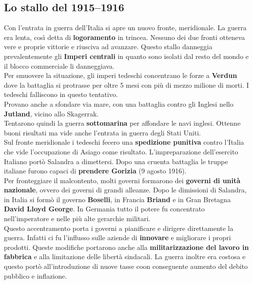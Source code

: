 \subsection{Lo stallo del 1915--1916}
Con l'entrata in guerra dell'Italia si apre un nuovo fronte, meridionale. La guerra era lenta, così
detta di \textbf{logoramento} in trincea. Nessuno dei due fronti otteneva vere e proprie vittorie
e riusciva ad avanzare. Questo stallo danneggia prevalentemente gli \textbf{Imperi centrali} in 
quanto sono isolati dal resto del mondo e il blocco commerciale li danneggiava.\\
Per smuovere la situazione, gli imperi tedeschi concentrano le forze a \textbf{Verdun} dove la
battaglia si protrasse per oltre 5 mesi con più di mezzo milione di morti. I tedeschi falliscono
in questo tentativo.\\
Provano anche a sfondare via mare, con una battaglia contro gli Inglesi nello \textbf{Jutland},
vicino allo Skagerrak.\\
Tentarono quindi la guerra \textbf{sottomarina} per affondare le navi inglesi. Ottenne buoni 
risultati ma vide anche l'entrata in guerra degli Stati Uniti.\\ [\baselineskip]
Sul fronte meridionale i tedeschi fecero una \textbf{spedizione punitiva} contro l'Italia che
vide l'occupazione di Asiago come risultato. L'impreparazione dell'esercito Italiano portò Salandra
a dimettersi. Dopo una cruenta battaglia le truppe italiane furono capaci di \textbf{prendere 
Gorizia} (9 agosto 1916).\\ [\baselineskip]
Per fronteggiare il malcontento, molti governi formarono dei \textbf{governi di unità nazionale}, 
ovvero dei governi di grandi alleanze. Dopo le dimissioni di Salandra, in Italia si formò il governo
\textbf{Boselli}, in Francia \textbf{Briand} e in Gran Bretagna \textbf{David Lloyd George}. In
Germania tutto il potere fu concentrato nell'imperatore e nelle più alte gerarchie militari.\\
Questo accentramento porta i governi a pianificare e dirigere direttamente la guerra. Infatti ci fu
l'influsso sulle aziende di \textbf{innovare} e migliorare i propri prodotti. Queste modifiche
portarono anche alla \textbf{militarizzazione del lavoro in fabbrica} e alla limitazione delle
libertà sindacali. La guerra inoltre era costosa e questo portò all'introduzione di nuove tasse
coon conseguente aumento del debito pubblico e inflazione.

